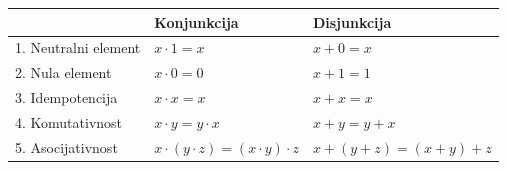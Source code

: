 \begingroup\gusttekst
\par\noindent\begin{tabularx}{\linewidth}{l>{\raggedright\arraybackslash}X>{\raggedright\arraybackslash}X}
\toprule &Konjunkcija&Disjunkcija\\\midrule
1. Neutralni element&\(x\cdot1=x\)&\(x+0=x\)\\[4mm]
2. Nula element&\(x\cdot0=0\)&\(x+1=1\)\\[4mm]
3. Idempotencija&\(x\cdot x=x\)&\(x+x=x\)\\[4mm]
4. Komutativnost&\(x\cdot y=y\cdot x\)&\(x+y=y+x\)\\[4mm]
5. Asocijativnost&\(x\cdot(y\cdot z)=(x\cdot y)\cdot z\)&\(x+(y+z)=(x+y)+z\)\\
\bottomrule
\end{tabularx}\par
\endgroup
